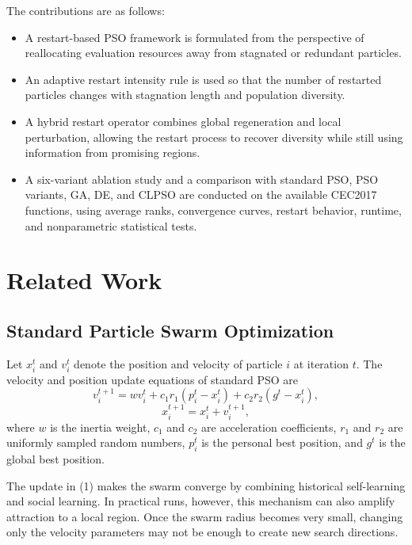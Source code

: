 \documentclass[conference]{IEEEtran}
\begin{document}
The contributions are as follows:
\begin{itemize}
    \item A restart-based PSO framework is formulated from the perspective of reallocating evaluation resources away from stagnated or redundant particles.
    \item An adaptive restart intensity rule is used so that the number of restarted particles changes with stagnation length and population diversity.
    \item A hybrid restart operator combines global regeneration and local perturbation, allowing the restart process to recover diversity while still using information from promising regions.
    \item A six-variant ablation study and a comparison with standard PSO, PSO variants, GA, DE, and CLPSO are conducted on the available CEC2017 functions, using average ranks, convergence curves, restart behavior, runtime, and nonparametric statistical tests.
\end{itemize}

\section{Related Work}\label{sec:related}

\subsection{Standard Particle Swarm Optimization}
Let $x_i^t$ and $v_i^t$ denote the position and velocity of particle $i$ at iteration $t$. The velocity and position update equations of standard PSO are
\begin{equation}
    v_i^{t+1}=w v_i^t+c_1 r_1(p_i^t-x_i^t)+c_2 r_2(g^t-x_i^t),
    \label{eq:pso_velocity}
\end{equation}
\begin{equation}
    x_i^{t+1}=x_i^t+v_i^{t+1},
    \label{eq:pso_position}
\end{equation}
where $w$ is the inertia weight, $c_1$ and $c_2$ are acceleration coefficients, $r_1$ and $r_2$ are uniformly sampled random numbers, $p_i^t$ is the personal best position, and $g^t$ is the global best position.

The update in (1) makes the swarm converge by combining historical self-learning and social learning. In practical runs, however, this mechanism can also amplify attraction to a local region. Once the swarm radius becomes very small, changing only the velocity parameters may not be enough to create new search directions.
\end{document}
